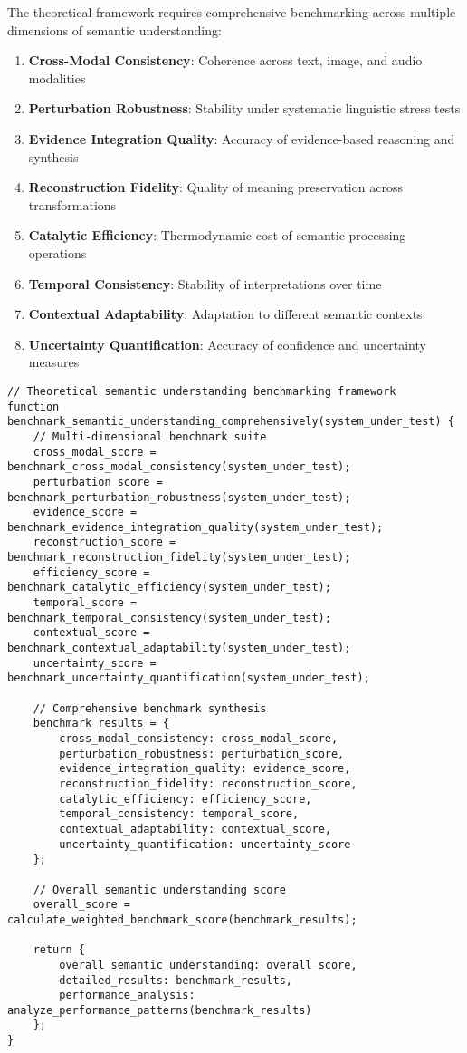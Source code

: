 \documentclass[12pt,a4paper,twoside]{article}
\begin{document}
The theoretical framework requires comprehensive benchmarking across multiple dimensions of semantic understanding:

\begin{enumerate}
\item \textbf{Cross-Modal Consistency}: Coherence across text, image, and audio modalities
\item \textbf{Perturbation Robustness}: Stability under systematic linguistic stress tests
\item \textbf{Evidence Integration Quality}: Accuracy of evidence-based reasoning and synthesis
\item \textbf{Reconstruction Fidelity}: Quality of meaning preservation across transformations
\item \textbf{Catalytic Efficiency}: Thermodynamic cost of semantic processing operations
\item \textbf{Temporal Consistency}: Stability of interpretations over time
\item \textbf{Contextual Adaptability}: Adaptation to different semantic contexts
\item \textbf{Uncertainty Quantification}: Accuracy of confidence and uncertainty measures
\end{enumerate}

\begin{lstlisting}[caption=Comprehensive Semantic Understanding Benchmarking]
// Theoretical semantic understanding benchmarking framework
function benchmark_semantic_understanding_comprehensively(system_under_test) {
    // Multi-dimensional benchmark suite
    cross_modal_score = benchmark_cross_modal_consistency(system_under_test);
    perturbation_score = benchmark_perturbation_robustness(system_under_test);
    evidence_score = benchmark_evidence_integration_quality(system_under_test);
    reconstruction_score = benchmark_reconstruction_fidelity(system_under_test);
    efficiency_score = benchmark_catalytic_efficiency(system_under_test);
    temporal_score = benchmark_temporal_consistency(system_under_test);
    contextual_score = benchmark_contextual_adaptability(system_under_test);
    uncertainty_score = benchmark_uncertainty_quantification(system_under_test);

    // Comprehensive benchmark synthesis
    benchmark_results = {
        cross_modal_consistency: cross_modal_score,
        perturbation_robustness: perturbation_score,
        evidence_integration_quality: evidence_score,
        reconstruction_fidelity: reconstruction_score,
        catalytic_efficiency: efficiency_score,
        temporal_consistency: temporal_score,
        contextual_adaptability: contextual_score,
        uncertainty_quantification: uncertainty_score
    };

    // Overall semantic understanding score
    overall_score = calculate_weighted_benchmark_score(benchmark_results);

    return {
        overall_semantic_understanding: overall_score,
        detailed_results: benchmark_results,
        performance_analysis: analyze_performance_patterns(benchmark_results)
    };
}
\end{lstlisting}
\end{document}
